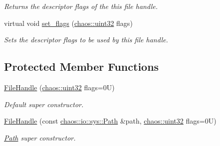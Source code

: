 \begin{DoxyCompactItemize}
\begin{DoxyCompactList}\small\item\em Returns the descriptor flags of the this file handle. \end{DoxyCompactList}\item 
virtual void \hyperlink{classchaos_1_1io_1_1sys_1_1_file_handle_a8ad8c2176597a8c56e38a3bd51b1c7dd}{set\+\_\+flags} (\hyperlink{namespacechaos_a8641b3ae4551f0b35570d4f9f4ec22d9}{chaos\+::uint32} flags)
\begin{DoxyCompactList}\small\item\em Sets the descriptor flags to be used by this file handle. \end{DoxyCompactList}\end{DoxyCompactItemize}
\subsection*{Protected Member Functions}
\begin{DoxyCompactItemize}
\item 
\hyperlink{classchaos_1_1io_1_1sys_1_1_file_handle_af5d96eae217fa6b8f770ba614b4beeaa}{File\+Handle} (\hyperlink{namespacechaos_a8641b3ae4551f0b35570d4f9f4ec22d9}{chaos\+::uint32} flags=0\+U)
\begin{DoxyCompactList}\small\item\em Default super constructor. \end{DoxyCompactList}\item 
\hyperlink{classchaos_1_1io_1_1sys_1_1_file_handle_ac27707755a7e9ab9390ee3ed50db9c3c}{File\+Handle} (const \hyperlink{classchaos_1_1io_1_1sys_1_1_path}{chaos\+::io\+::sys\+::\+Path} \&path, \hyperlink{namespacechaos_a8641b3ae4551f0b35570d4f9f4ec22d9}{chaos\+::uint32} flags=0\+U)
\begin{DoxyCompactList}\small\item\em \hyperlink{classchaos_1_1io_1_1sys_1_1_path}{Path} super constructor. \end{DoxyCompactList}\end{DoxyCompactItemize}
